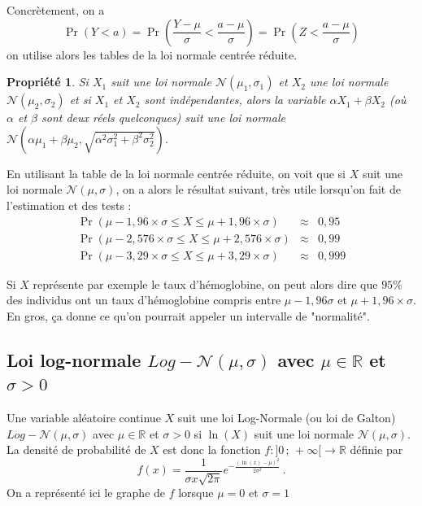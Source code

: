 \documentclass[12pt, a4paper]{book}
\newtheorem{prop}[thm]{Propriété}
\numberwithin{equation}{section}
\begin{document}
Concrètement, on a
$$
\Pr(Y<a) = \Pr( \frac{Y-\mu}{\sigma} < \frac{a-\mu}{\sigma}) = \Pr(Z< \frac{a-\mu}{\sigma} )
$$
on utilise alors les tables de la loi normale centrée réduite.

\begin{prop}
Si $X_1$ suit une loi normale $\mathcal{N}(\mu_1,\sigma_1)$ et 
$X_2$ une loi normale $\mathcal{N}(\mu_2,\sigma_2)$ et si $X_1$ et $X_2$ sont indépendantes, alors
la variable $\alpha X_1 + \beta X_2$ (où $\alpha$ et $\beta$ sont deux réels quelconques) suit une loi
normale $\mathcal{N}(\alpha\mu_1+\beta\mu_2,\sqrt{\alpha^2\sigma_1^2+\beta^2\sigma_2^2})$.
\end{prop}

 En utilisant la table de la loi normale centrée réduite, on voit que si $X$
suit une loi normale $\mathcal{N}(\mu,\sigma)$, on a alors le résultat suivant, très utile lorsqu'on fait de
l'estimation et des tests :
\begin{eqnarray*}
\Pr(\mu-1,96\times \sigma \leq X \leq \mu+1,96\times \sigma) & \approx & 0,95 \\
\Pr(\mu-2,576 \times\sigma \leq X \leq \mu+2,576 \times \sigma) & \approx & 0,99 \\
\Pr(\mu-3,29 \times \sigma \leq X \leq \mu+3,29 \times\sigma) & \approx & 0,999
\end{eqnarray*}

Si $X$ représente par exemple le taux d'hémoglobine, on peut alors dire que $95\%$ des individus ont un 
taux d'hémoglobine compris entre $\mu-1,96\sigma$ et $\mu+1,96\times \sigma$. En gros, ça donne ce qu'on 
pourrait appeler un intervalle de "normalité".


\subsection[Loi log-normale ]{Loi log-normale $Log-\mathcal{N}(\mu,\sigma)$ avec $\mu\in \mathbb{R}$ et $\sigma>0$}

Une variable aléatoire continue $X$ suit une loi Log-Normale (ou loi de Galton) $Log-\mathcal{N}(\mu,\sigma)$ avec
$\mu\in \mathbb{R}$ et $\sigma>0$ si $\ln(X)$ suit une loi normale $\mathcal{N}(\mu,\sigma)$.
La densité de probabilité de $X$ est donc la fonction 
$f : ]0\,;\,+\infty[ \longrightarrow \mathbb{R}$ définie par  
$$
f(x)=\frac{1}{\sigma x\sqrt{2\pi}} e^{-\frac{(\ln (x) -\mu)^2}{2\sigma^2}}\,.
$$
On a représenté ici le graphe de $f$ lorsque $\mu=0$ et $\sigma=1$

\begin{center}
\end{center}
\end{document}
